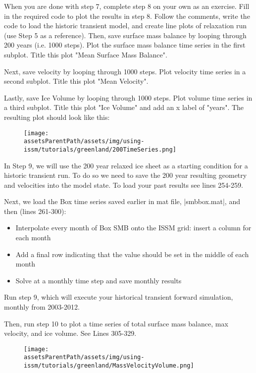 When you are done with step 7, complete step 8 on your own as an exercise. Fill in the required code to plot the results in step 8. Follow the comments, write the code to load the historic transient model, and create line plots of relaxation run (use Step 5 as a reference). Then, save surface mass balance by looping through 200 years (i.e. 1000 steps). Plot the surface mass balance time series in the first subplot. Title this plot "Mean Surface Mass Balance".

Next, save velocity by looping through 1000 steps. Plot velocity time series in a second subplot. Title this plot "Mean Velocity".

Lastly, save Ice Volume by looping through 1000 steps. Plot volume time series in a third subplot. Title this plot "Ice Volume" and add an x label of "years". The resulting plot should look like this:

\begin{figure}[H]
	\begin{center}
		\texttt{[image: \\assetsParentPath/assets/img/using-issm/tutorials/greenland/200TimeSeries.png]}
	\end{center}
\end{figure}

In Step 9, we will use the 200 year relaxed ice sheet as a starting condition for a historic transient run. To do so we need to save the 200 year resulting geometry and velocities into the model state. To load your past results see lines 254-259.

Next, we load the Box time series saved earlier in mat file, \lstinlinebg|smbbox.mat|, and then (lines 261-300):
\begin{itemize}
	\item Interpolate every month of Box SMB onto the ISSM grid: insert a column for each month
	\item Add a final row indicating that the value should be set in the middle of each month
	\item Solve at a monthly time step and save monthly results
\end{itemize}

Run step 9, which will execute your historical transient forward simulation, monthly from 2003-2012.

Then, run step 10 to plot a time series of total surface mass balance, max velocity, and ice volume. See Lines 305-329.

\begin{figure}[H]
	\begin{center}
		\texttt{[image: \\assetsParentPath/assets/img/using-issm/tutorials/greenland/MassVelocityVolume.png]}
	\end{center}
\end{figure}

